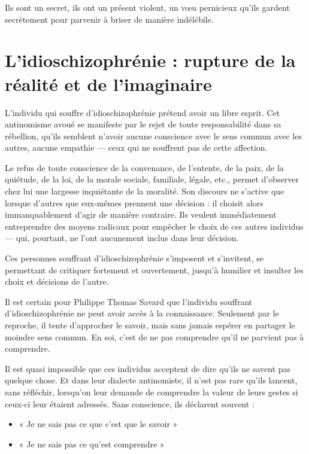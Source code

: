 \documentclass[12pt,oneside]{article}
\begin{document}
Ils sont un secret, ils ont un présent violent, un vœu pernicieux qu'ils gardent secrètement pour parvenir à briser de manière indélébile.

\section{L'idioschizophrénie : rupture de la réalité et de l'imaginaire}

L'individu qui souffre d'idioschizophrénie prétend avoir un libre esprit. Cet antinomisme avoué se manifeste par le rejet de toute responsabilité dans sa rébellion, qu'ils semblent n'avoir aucune conscience avec le sens commun avec les autres, aucune empathie --- ceux qui ne souffrent pas de cette affection.

Le refus de toute conscience de la convenance, de l'entente, de la paix, de la quiétude, de la loi, de la morale sociale, familiale, légale, etc., permet d'observer chez lui une largesse inquiétante de la moralité. Son discours ne s'active que lorsque d'autres que eux-mêmes prennent une décision : il choisit alors immanquablement d'agir de manière contraire. Ils veulent immédiatement entreprendre des moyens radicaux pour empêcher le choix de ces autres individus --- qui, pourtant, ne l'ont aucunement inclus dans leur décision.

Ces personnes souffrant d'idioschizophrénie s'imposent et s'invitent, se permettant de critiquer fortement et ouvertement, jusqu'à humilier et insulter les choix et décisions de l'autre.

Il est certain pour Philippe Thomas Savard que l'individu souffrant d'idioschizophrénie ne peut avoir accès à la connaissance. Seulement par le reproche, il tente d'approcher le savoir, mais sans jamais espérer en partager le moindre sens commun. En soi, c'est de ne pas comprendre qu'il ne parvient pas à comprendre.

Il est quasi impossible que ces individus acceptent de dire qu'ils ne savent pas quelque chose. Et dans leur dialecte antinomiste, il n'est pas rare qu'ils lancent, sans réfléchir, lorsqu'on leur demande de comprendre la valeur de leurs gestes si ceux-ci leur étaient adressés. Sans conscience, ils déclarent souvent :
\begin{itemize}
    \item « Je ne sais pas ce que c'est que le savoir »
    \item « Je ne sais pas ce qu'est comprendre »
\end{itemize}
\end{document}

